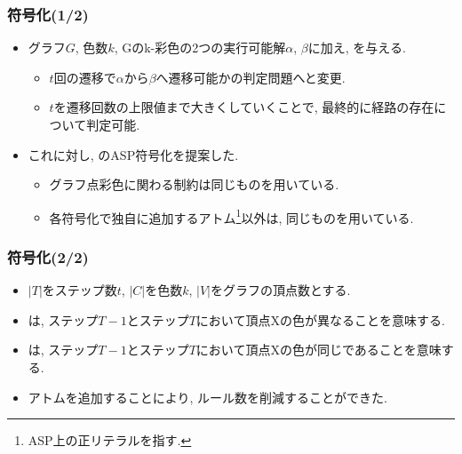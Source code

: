 \documentclass[dvipdfmx,11pt]{beamer}
\begin{document}
\begin{frame}\frametitle{符号化(1/2)}

  \begin{itemize}
    \item グラフ$G$, 色数$k$, Gのk-彩色の2つの実行可能解$\alpha$, $\beta$に加え, を与える.
    \begin{itemize}
      \item $t$回の遷移で$\alpha$から$\beta$へ遷移可能かの判定問題へと変更.
      \item $t$を遷移回数の上限値まで大きくしていくことで, 最終的に経路の存在について判定可能. 
    \end{itemize}
    \item これに対し, のASP符号化を提案した. 
    \begin{itemize}
      \item グラフ点彩色に関わる制約は同じものを用いている.
      \item 各符号化で独自に追加するアトム\footnote{ASP上の正リテラルを指す.}以外は, 同じものを用いている.
    \end{itemize}
  \end{itemize}


  
\end{frame}


\begin{frame}\frametitle{符号化(2/2)}

  \begin{itemize}
    \item $|T|$をステップ数$t$, $|C|$を色数$k$, $|V|$をグラフの頂点数とする.
    
  \end{itemize}

  \begin{table}[t]
    \centering
    
  \end{table}

  \begin{itemize}
    \item {}は, ステップ$T-1$とステップ$T$において頂点Xの色が異なることを意味する.
    \item {}は, ステップ$T-1$とステップ$T$において頂点Xの色が同じであることを意味する.
    \item アトムを追加することにより, ルール数を削減することができた.
  \end{itemize}
  
\end{frame}
\end{document}
